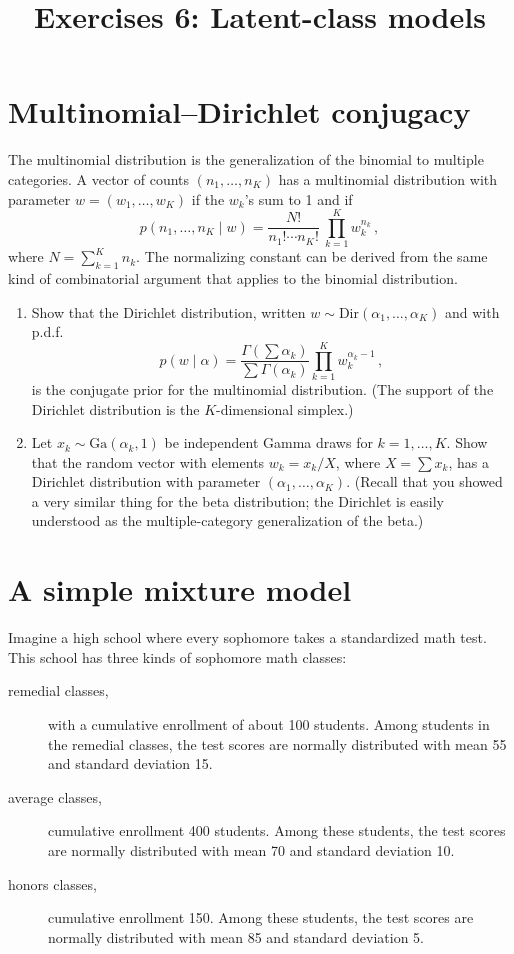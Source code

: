 \documentclass{mynotes}
\title[Exercises 6 $\cdot$ SSC 383D]{Exercises 6: Latent-class models}
\date{}  %
\begin{document}
\maketitle%

\section{Multinomial--Dirichlet conjugacy}

The multinomial distribution is the generalization of the binomial to multiple categories.  A vector of counts $(n_1, \ldots, n_K)$ has a multinomial distribution with parameter $w = (w_1, \ldots, w_K)$ if the $w_k$'s sum to 1 and if
$$
p(n_1, \ldots, n_K \mid w) = \frac{N!}{n_1! \cdots n_K!} \ \prod_{k=1}^K w_k^{n_k} \, ,
$$
where $N = \sum_{k=1}^K n_k$.  The normalizing constant can be derived from the same kind of combinatorial argument that applies to the binomial distribution.

\begin{enumerate}
\item Show that the Dirichlet distribution, written $w \sim \mbox{Dir}(\alpha_1, \ldots, \alpha_K)$ and with p.d.f.
$$
p(w \mid \alpha) = \frac{\Gamma(\sum \alpha_k) }{\sum \Gamma(\alpha_k) } \prod_{k=1}^K w_k^{\alpha_k -1} \, ,
$$
is the conjugate prior for the multinomial distribution.  (The support of the Dirichlet distribution is the $K$-dimensional simplex.)
\item Let $x_k \sim \mbox{Ga}(\alpha_k, 1)$ be independent Gamma draws for $k=1, \ldots, K$.  Show that the random vector with elements $w_k = x_k/X$, where $X = \sum{x_k}$, has a Dirichlet distribution with parameter $(\alpha_1, \ldots, \alpha_K)$.  (Recall that you showed a very similar thing for the beta distribution; the Dirichlet is easily understood as the multiple-category generalization of the beta.)
\end{enumerate}

\section{A simple mixture model}

Imagine a high school where every sophomore takes a standardized math test.  This school has three kinds of sophomore math classes:
\begin{description}
\item[remedial classes,] with a cumulative enrollment of about 100 students.  Among students in the remedial classes, the test scores are normally distributed with mean 55 and standard deviation 15.
\item[average classes,] cumulative enrollment 400 students.  Among these students, the test scores are normally distributed with mean 70 and standard deviation 10.
\item[honors classes,] cumulative enrollment 150. Among these students, the test scores are normally distributed with mean 85 and standard deviation 5.
\end{description}
\end{document}
